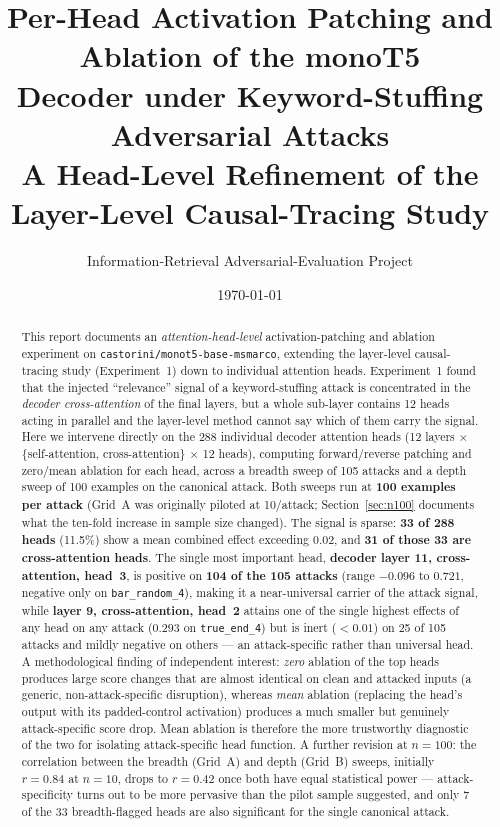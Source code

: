\documentclass[11pt]{article}
\title{\textbf{Per-Head Activation Patching and Ablation of the monoT5 \\[2pt]
Decoder under Keyword-Stuffing Adversarial Attacks} \\[6pt]
\large A Head-Level Refinement of the Layer-Level Causal-Tracing Study}
\author{Information-Retrieval Adversarial-Evaluation Project}
\date{\today}
\begin{document}
\maketitle

\begin{abstract}
This report documents an \emph{attention-head-level} activation-patching and
ablation experiment on \texttt{castorini/monot5-base-msmarco}, extending the
layer-level causal-tracing study (Experiment~1) down to individual attention
heads. Experiment~1 found that the injected ``relevance'' signal of a
keyword-stuffing attack is concentrated in the \emph{decoder cross-attention}
of the final layers, but a whole sub-layer contains 12 heads acting in
parallel and the layer-level method cannot say which of them carry the
signal. Here we intervene directly on the 288 individual decoder attention
heads (12 layers $\times$ \{self-attention, cross-attention\} $\times$ 12
heads), computing forward/reverse patching and zero/mean ablation for each
head, across a breadth sweep of 105 attacks and a depth sweep of 100 examples
on the canonical attack. Both sweeps run at \textbf{100 examples per attack}
(Grid~A was originally piloted at 10/attack; Section~\ref{sec:n100}
documents what the ten-fold increase in sample size changed). The signal is
sparse: \textbf{33 of 288 heads} (11.5\%) show a mean combined effect
exceeding 0.02, and \textbf{31 of those 33 are cross-attention heads}. The
single most important head, \textbf{decoder layer 11, cross-attention,
head~3}, is positive on \textbf{104 of the 105 attacks} (range
$-0.096$ to $0.721$, negative only on \texttt{bar\_random\_4}), making it a
near-universal carrier of the attack signal, while \textbf{layer 9,
cross-attention, head~2} attains one of the single highest effects of any
head on any attack ($0.293$ on \texttt{true\_end\_4}) but is inert
($<0.01$) on 25 of 105 attacks and mildly negative on others — an
attack-specific rather than universal head. A methodological finding of
independent interest: \emph{zero} ablation of the top heads produces large
score changes that are almost identical on clean and attacked inputs (a
generic, non-attack-specific disruption), whereas \emph{mean} ablation
(replacing the head's output with its padded-control activation) produces a
much smaller but genuinely attack-specific score drop. Mean ablation is
therefore the more trustworthy diagnostic of the two for isolating
attack-specific head function. A further revision at $n=100$: the
correlation between the breadth (Grid~A) and depth (Grid~B) sweeps, initially
$r=0.84$ at $n=10$, drops to $r=0.42$ once both have equal statistical
power — attack-specificity turns out to be more pervasive than the pilot
sample suggested, and only 7 of the 33 breadth-flagged heads are also
significant for the single canonical attack.
\end{abstract}
\end{document}
